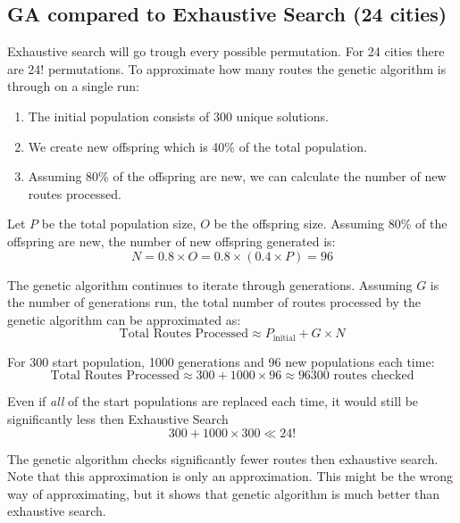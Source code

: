 \documentclass{article}
\begin{document}
    \newpage

    \subsection{GA compared to Exhaustive Search (24 cities)}

    Exhaustive search will go trough every possible permutation. For 24 cities there are 24! permutations. 
    To approximate how many routes the genetic algorithm is through on a single run:

    \begin{enumerate}
        \item The initial population consists of 300 unique solutions.
        \item We create new offspring which is 40\% of the total population.
        \item Assuming 80\% of the offspring are new, we can calculate the number of new routes processed.
    \end{enumerate}

    Let \(P\) be the total population size, \(O\) be the offspring size.
    Assuming 80\% of the offspring are new, the number of new offspring generated is:
    \[
    N = 0.8 \times O = 0.8 \times (0.4 \times P) = 96
    \]

    The genetic algorithm continues to iterate through generations. Assuming \(G\) is the number of generations run, the total number of routes processed by the genetic algorithm can be approximated as:
    \[
    \text{Total Routes Processed} \approx P_{\text{initial}} + G \times N
    \]

    For 300 start population, 1000 generations and 96 new populations each time: 
    \[
    \text{Total Routes Processed} \approx 300 + 1000 \times 96 \approx 96300 \text{ routes checked}
    \]

    Even if \textit{all} of the start populations are replaced each time, it would still be significantly less then Exhaustive Search
    \[
    300 + 1000 \times 300 \ll 24!
    \]


    The genetic algorithm checks significantly fewer routes then exhaustive search. Note that this approximation is only an approximation. This might be the wrong way of approximating, but it shows that genetic algorithm is much better than exhaustive search. 
\end{document}
